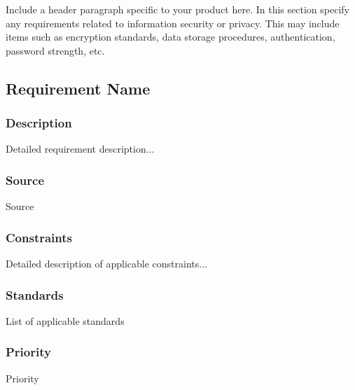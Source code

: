Include a header paragraph specific to your product here. In this section specify any requirements related to information security or privacy. This may include items such as encryption standards, data storage procedures, authentication, password strength, etc.

\subsection{Requirement Name}
\subsubsection{Description}
Detailed requirement description...
\subsubsection{Source}
Source
\subsubsection{Constraints}
Detailed description of applicable constraints...
\subsubsection{Standards}
List of applicable standards
\subsubsection{Priority}
Priority